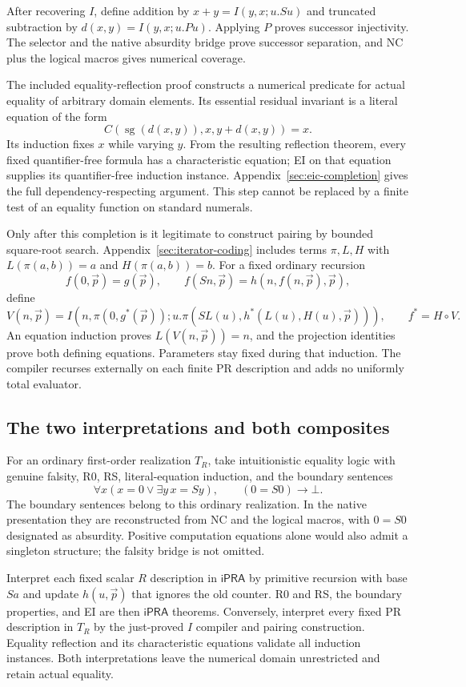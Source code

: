 \documentclass[11pt,letterpaper]{article}
\theoremstyle{definition}\newtheorem{definition}[theorem]{Definition}
\theoremstyle{remark}\newtheorem{remark}[theorem]{Remark}
\newcommand{\ipra}{\mathsf{iPRA}}
\begin{document}
After recovering $I$, define addition by $x+y=I(y,x;u.Su)$ and truncated
subtraction by $d(x,y)=I(y,x;u.Pu)$. Applying $P$ proves successor
injectivity. The selector and the native absurdity bridge prove successor
separation, and NC plus the logical macros gives numerical coverage.

The included equality-reflection proof constructs a numerical predicate
for actual equality of arbitrary domain elements. Its essential residual
invariant is a literal equation of the form
\[
 C(\operatorname{sg}(d(x,y)),x,y+d(x,y))=x.
\]
Its induction fixes $x$ while varying $y$. From the resulting reflection
theorem, every fixed quantifier-free formula has a characteristic equation;
EI on that equation supplies its quantifier-free induction instance.
Appendix~\ref{sec:eic-completion} gives the full dependency-respecting
argument. This step cannot be replaced by a finite test of an equality
function on standard numerals.

Only after this completion is it legitimate to construct pairing by
bounded square-root search. Appendix~\ref{sec:iterator-coding} includes
terms $\pi,L,H$ with $L(\pi(a,b))=a$ and $H(\pi(a,b))=b$.
For a fixed ordinary recursion
\[
 f(0,\vec p)=g(\vec p),\qquad
 f(Sn,\vec p)=h(n,f(n,\vec p),\vec p),
\]
define
\[
 V(n,\vec p)=I(n,\pi(0,g^*(\vec p));
 u.\pi(SL(u),h^*(L(u),H(u),\vec p))),\qquad f^*=H\circ V.
\]
An equation induction proves $L(V(n,\vec p))=n$, and the projection
identities prove both defining equations. Parameters stay fixed during
that induction. The compiler recurses externally on each finite PR
description and adds no uniformly total evaluator.

\subsection{The two interpretations and both composites}

For an ordinary first-order realization $T_R$, take intuitionistic
equality logic with genuine falsity, R0, RS, literal-equation induction,
and the boundary sentences
\[
 \forall x(x=0\vee\exists y\,x=Sy),\qquad (0=S0)\to\bot.
\]
The boundary sentences belong to this ordinary realization. In the native
presentation they are reconstructed from NC and the logical macros,
with $0=S0$ designated as absurdity. Positive computation equations alone
would also admit a singleton structure; the falsity bridge is not omitted.

Interpret each fixed scalar $R$ description in $\ipra$ by primitive
recursion with base $Sa$ and update $h(u,\vec p)$ that ignores the old
counter. R0 and RS, the boundary properties, and EI are then $\ipra$
theorems. Conversely, interpret every fixed PR description in $T_R$ by
the just-proved $I$ compiler and pairing construction. Equality reflection
and its characteristic equations validate all induction instances.
Both interpretations leave the numerical domain unrestricted and retain
actual equality.
\end{document}
